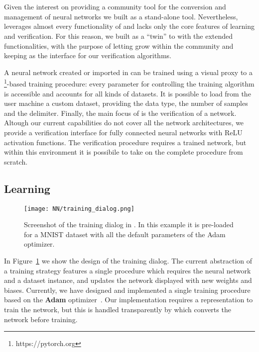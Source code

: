 \section{\nevertwo{}}
\label{sec:never2}

Given the interest on providing a community tool for the conversion and
management of neural networks we built \coconet{} as a stand-alone tool.
Nevertheless, \coconet{} leverages almost every functionality of \pynever{}
and lacks only the core features of learning and verification.
For this reason, we built \nevertwo{} as a ``twin'' to \coconet{} with
the extended functionalities, with the purpose of letting \coconet{} grow
within the community and keeping \nevertwo{} as the interface for our
verification algorithms.

A neural network created or imported in \nevertwo{} can be trained using 
a visual proxy to a \pytorch\footnote{https://pytorch.org}-based training
procedure: every parameter for controlling the training algorithm is 
accessible and accounts for all kinds of datasets. It is possible to load 
from the user machine a custom dataset, providing the data type, the number
of samples and the delimiter. Finally, the main focus of \nevertwo{} is the
verification of a network. Altough our current capabilities do not cover 
all the network architectures, we provide a verification interface for 
fully connected neural networks with ReLU activation functions.
The verification procedure requires a trained network, but within this
environment it is possibile to take on the complete procedure from scratch.

\subsection{Learning}
%
\begin{figure}[t]
	\caption{\label{fig:never-training} Screenshot of the training dialog in
		\nevertwo{}. In this example it is pre-loaded for a MNIST dataset
		with all the default parameters of the Adam optimizer.}
	\centering
	\texttt{[image: NN/training\_dialog.png]}
\end{figure}
%
In Figure~\ref{fig:never-training} we show the design of the training 
dialog. The current abstraction of a training strategy features a single
procedure which requires the neural network and a dataset instance, and 
updates the network displayed with new weights and biases. Currently, 
we have designed and implemented a single training procedure based on the 
\textbf{Adam} optimizer~\cite{kingma2017adam}. Our implementation requires
a \pytorch{} representation to train the network, but this is handled 
transparently by \pynever{} which converts the network before training.

